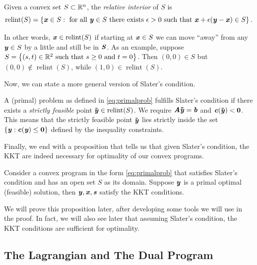\begin{definition} \label{def:relint}
  Given a convex set $S \subset \mathbb{R}^n$, the \emph{relative interior} of $S$ is
  \[
    \operatorname{relint}(S) = \left\{\boldsymbol{\mathit{x}} \in S : \text{ for all } \boldsymbol{\mathit{y}}
      \in S \text{ there exists } \epsilon > 0 \text{ such that }
      \boldsymbol{\mathit{x}} + \epsilon(\boldsymbol{\mathit{y}} - \boldsymbol{\mathit{x}}) \in S \right\}
    .
  \]
\end{definition}
In other words, $\boldsymbol{\mathit{x}} \in \operatorname{relint}(S)$ if starting at $\boldsymbol{\mathit{x}}
\in S$ we can move
``away'' from any $\boldsymbol{\mathit{y}} \in S$ by a little and still be in $\boldsymbol{\mathit{S}}$.
As an example, suppose $S = \left\{(s,t) \in \mathbb{R}^2 \text{ such that } s
  \geq 0 \text{ and } t = 0 \right\}$.
Then $(0,0) \in S$ but $(0,0) \not\in \operatorname{relint}(S)$, while
$(1,0) \in \operatorname{relint}(S)$.

Now, we can state a more general version of Slater's condition.

\begin{definition} \label{def:slatergeneral}
A (primal) problem as defined in \eqref{eq:primalprob} fulfills
Slater's condition if there exists a \emph{strictly feasible} point
$\boldsymbol{\tilde{\mathit{y}}} \in \operatorname{relint}(S)$.
We require $\boldsymbol{\mathit{A}}\boldsymbol{\tilde{\mathit{y}}} = \boldsymbol{\mathit{b}}$ and $\boldsymbol{\mathit{c}}(\boldsymbol{\tilde{\mathit{y}}}) <
\boldsymbol{0}$.
This means that the strictly feasible point $\boldsymbol{\tilde{\mathit{y}}}$ lies strictly inside the set $\{\boldsymbol{\mathit{y}} : \boldsymbol{\mathit{c}}(\boldsymbol{\mathit{y}}) \leq \boldsymbol{0}\}$ defined by the inequality constraints.
\end{definition}

Finally, we end with a proposition that tells us that given Slater's
condition, the KKT are indeed necessary for optimality of our convex programs.

\begin{proposition}
  \label{pro:KKTnecessary}
  Consider a convex program in the form \eqref{eq:primalprob} that
  satisfies Slater's condition and has an open set $S$ as its domain.
  Suppose $\boldsymbol{\mathit{y}}$ is a primal optimal (feasible) solution,
  then  $\boldsymbol{\mathit{y}}, \boldsymbol{\mathit{x}}, \boldsymbol{\mathit{s}}$ satisfy the KKT conditions.
\end{proposition}

We will prove this proposition later, after developing some tools we will
use in the proof.
In fact, we will also see later that assuming Slater's condition, the KKT
conditions are sufficient for optimality.

\subsection{The Lagrangian and The Dual Program}

